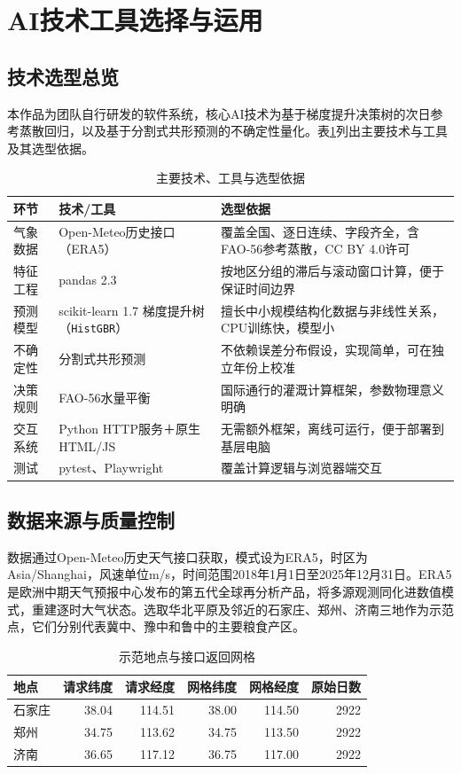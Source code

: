 \section{AI技术工具选择与运用}
\subsection{技术选型总览}
本作品为团队自行研发的软件系统，核心AI技术为基于梯度提升决策树的次日参考蒸散回归，以及基于分割式共形预测的不确定性量化。表\ref{tab:stack}列出主要技术与工具及其选型依据。

\begin{table}[H]\centering\small
\caption{主要技术、工具与选型依据}\label{tab:stack}
\begin{tabularx}{\linewidth}{@{}p{.20\linewidth}p{.25\linewidth}X@{}}\toprule
环节 & 技术/工具 & 选型依据\\\midrule
气象数据 & Open-Meteo历史接口（ERA5） & 覆盖全国、逐日连续、字段齐全，含FAO-56参考蒸散，CC BY 4.0许可\\
特征工程 & pandas 2.3 & 按地区分组的滞后与滚动窗口计算，便于保证时间边界\\
预测模型 & scikit-learn 1.7 梯度提升树（\texttt{\small HistGBR}） & 擅长中小规模结构化数据与非线性关系，CPU训练快，模型小\\
不确定性 & 分割式共形预测 & 不依赖误差分布假设，实现简单，可在独立年份上校准\\
决策规则 & FAO-56水量平衡 & 国际通行的灌溉计算框架，参数物理意义明确\\
交互系统 & Python HTTP服务＋原生HTML/JS & 无需额外框架，离线可运行，便于部署到基层电脑\\
测试 & pytest、Playwright & 覆盖计算逻辑与浏览器端交互\\\bottomrule
\end{tabularx}
\end{table}

\subsection{数据来源与质量控制}
数据通过Open-Meteo历史天气接口获取\cite{om}，模式设为ERA5，时区为Asia/Shanghai，风速单位m/s，时间范围2018年1月1日至2025年12月31日。ERA5是欧洲中期天气预报中心发布的第五代全球再分析产品，将多源观测同化进数值模式，重建逐时大气状态\cite{era5}。选取华北平原及邻近的石家庄、郑州、济南三地作为示范点，它们分别代表冀中、豫中和鲁中的主要粮食产区。

\begin{table}[H]\centering\small
\caption{示范地点与接口返回网格}\label{tab:sites}
\begin{tabular}{lrrrrr}\toprule
地点 & 请求纬度 & 请求经度 & 网格纬度 & 网格经度 & 原始日数\\\midrule
石家庄 & 38.04 & 114.51 & 38.00 & 114.50 & 2922\\
郑州 & 34.75 & 113.62 & 34.75 & 113.50 & 2922\\
济南 & 36.65 & 117.12 & 36.75 & 117.00 & 2922\\\bottomrule
\end{tabular}
\end{table}

